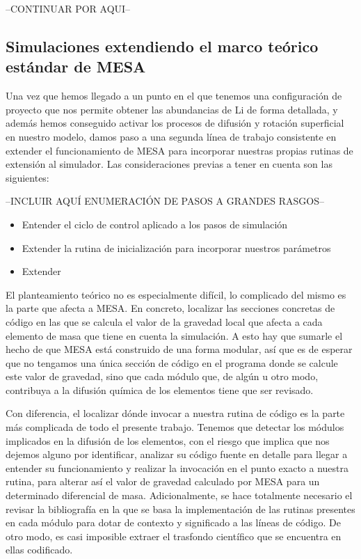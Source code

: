 --CONTINUAR POR AQUI--

\subsection{Simulaciones extendiendo el marco teórico estándar de MESA}
Una vez que hemos llegado a un punto en el que tenemos una configuración de proyecto que nos permite obtener las abundancias de Li de forma detallada, y además hemos conseguido activar los procesos de difusión y rotación superficial en nuestro modelo, damos paso a una segunda línea de trabajo consistente en extender el funcionamiento de MESA para incorporar nuestras propias rutinas de extensión al simulador. Las consideraciones previas a tener en cuenta son las siguientes:

--INCLUIR AQUÍ ENUMERACIÓN DE PASOS A GRANDES RASGOS--
\begin{itemize}
    \item Entender el ciclo de control aplicado a los pasos de simulación
    \item Extender la rutina de inicialización para incorporar nuestros parámetros
    \item Extender 
\end{itemize}

El planteamiento teórico no es especialmente difícil, lo complicado del mismo es la parte que afecta a MESA. En concreto, localizar las secciones concretas de código en las que se calcula el valor de la gravedad local que afecta a cada elemento de masa que tiene en cuenta la simulación. A esto hay que sumarle el hecho de que MESA está construido de una forma modular, así que es de esperar que no tengamos una única sección de código en el programa donde se calcule este valor de gravedad, sino que cada módulo que, de algún u otro modo, contribuya a la difusión química de los elementos tiene que ser revisado.\par

Con diferencia, el localizar dónde invocar a nuestra rutina de código es la parte más complicada de todo el presente trabajo. Tenemos que detectar los módulos implicados en la difusión de los elementos, con el riesgo que implica que nos dejemos alguno por identificar, analizar su código fuente en detalle para llegar a entender su funcionamiento y realizar la invocación en el punto exacto a nuestra rutina, para alterar así el valor de gravedad calculado por MESA para un determinado diferencial de masa. Adicionalmente, se hace totalmente necesario el revisar la bibliografía en la que se basa la implementación de las rutinas presentes en cada módulo para dotar de contexto y significado a las líneas de código. De otro modo, es casi imposible extraer el trasfondo científico que se encuentra en ellas codificado.\par

